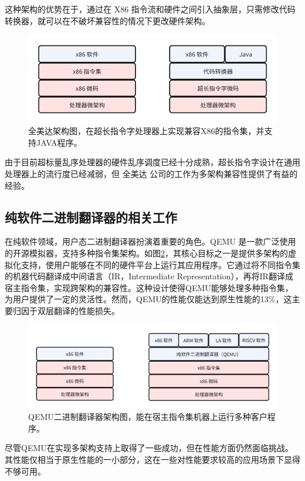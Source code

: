 \documentclass{Style/ucasproposal}%
\begin{document}
这种架构的优势在于，通过在 X86 指令流和硬件之间引入抽象层，只需修改代码转换器，就可以在不破坏兼容性的情况下更改硬件架构。

\begin{figure}[h]
    \centering
    \includegraphics[width=0.8\linewidth]{./feishuImage/transmeta_arch.png}
    \caption{全美达架构图，在超长指令字处理器上实现兼容X86的指令集，并支持JAVA程序。}
    \label{img:transmeta_arch}
  \end{figure}


由于目前超标量乱序处理器的硬件乱序调度已经十分成熟，超长指令字设计在通用处理器上的流行度已经减弱，但 全美达 公司的工作为多架构兼容性提供了有益的经验。

\subsection{纯软件二进制翻译器的相关工作}

在纯软件领域，用户态二进制翻译器扮演着重要的角色。QEMU 是一款广泛使用的开源模拟器，支持多种指令集架构。如图\ref{img:qemu_arch}，其核心目标之一是提供多架构的虚拟化支持，使用户能够在不同的硬件平台上运行其应用程序。它通过将不同指令集的机器代码翻译成中间语言（IR，Intermediate Representation），再将IR翻译成宿主指令集，实现跨架构的兼容性。这种设计使得QEMU能够处理多种指令集，为用户提供了一定的灵活性。然而，QEMU的性能仅能达到原生性能的13\%，这主要归因于双层翻译的性能损失。

\begin{figure}[h]
  \centering
  \includegraphics[width=0.8\linewidth]{./feishuImage/qemu_arch.png}
  \caption{QEMU二进制翻译器架构图，能在宿主指令集机器上运行多种客户程序。}
  \label{img:qemu_arch}
\end{figure}

尽管QEMU在实现多架构支持上取得了一些成功，但在性能方面仍然面临挑战。其性能仅相当于原生性能的一小部分，这在一些对性能要求较高的应用场景下显得不够可用。
\end{document}
